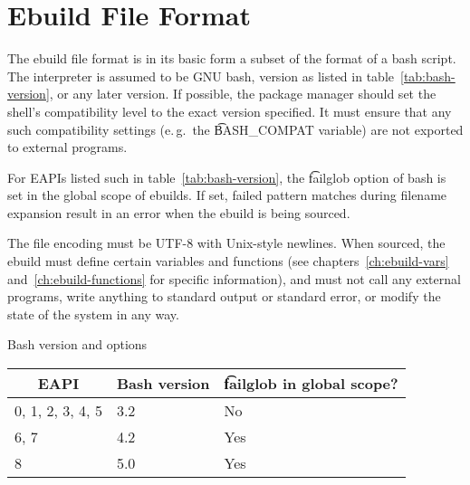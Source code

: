 \chapter{Ebuild File Format}
\label{ch:ebuild-format}

 The ebuild file format is in its basic form a subset of the format of
a bash script. The interpreter is assumed to be GNU bash, version as listed in
table~\ref{tab:bash-version}, or any later version. If possible, the package manager should set
the shell's compatibility level to the exact version specified. It must ensure that any such
compatibility settings (e.\,g.\ the \t{BASH_COMPAT} variable) are not exported to external programs.

 For EAPIs listed such in table~\ref{tab:bash-version}, the \t{failglob}
option of bash is set in the global scope of ebuilds. If set, failed pattern matches during
filename expansion result in an error when the ebuild is being sourced.

The file encoding must be UTF-8 with Unix-style newlines. When sourced, the ebuild must define
certain variables and functions (see chapters~\ref{ch:ebuild-vars} and~\ref{ch:ebuild-functions}
for specific information), and must not call any external programs, write anything to standard
output or standard error, or modify the state of the system in any way.

\begin{centertable}{Bash version and options}
    \label{tab:bash-version}
    \begin{tabular}{lll}
      \toprule
      \multicolumn{1}{c}{\textbf{EAPI}} &
      \multicolumn{1}{c}{\textbf{Bash version}} &
      \multicolumn{1}{c}{\textbf{\t{failglob} in global scope?}} \\
      \midrule
      0, 1, 2, 3, 4, 5  & 3.2 & No  \\
      6, 7              & 4.2 & Yes \\
      8                 & 5.0 & Yes \\
      \bottomrule
    \end{tabular}
\end{centertable}


